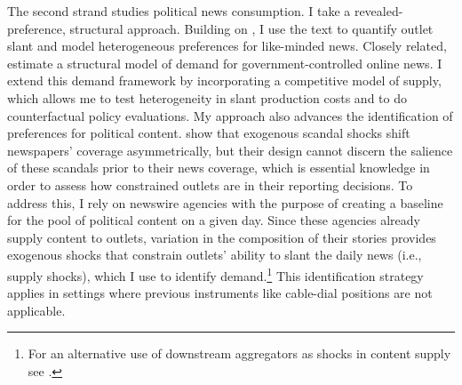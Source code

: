 \documentclass[12pt]{article}
\begin{document}
The second strand studies political news consumption. I take a revealed-preference, structural approach. Building on \citet{gentzkow2010media}, I use the text to quantify outlet slant and model heterogeneous preferences for like-minded news. Closely related, \citet{SimonovRao2022} estimate a structural model of demand for government-controlled online news. I extend this demand framework by incorporating a competitive model of supply, which allows me to test heterogeneity in slant production costs and to do counterfactual policy evaluations. My approach also advances the identification of preferences for political content. \citet{Puglisi2011NewspaperCO} show that exogenous scandal shocks shift  newspapers’ coverage asymmetrically, but their design cannot discern the salience of these scandals prior to their news coverage, which is essential knowledge in order to assess how constrained outlets are in their reporting decisions. To address this, I rely on newswire agencies with the purpose of creating a baseline for the pool of political content on a given day. Since these agencies already supply content to outlets, variation in the composition of their stories provides exogenous shocks that constrain outlets’ ability to slant the daily news (i.e., supply shocks), which I use to identify demand.\footnote{For an alternative use of downstream aggregators as shocks in content supply see \cite{milena}.} This identification strategy applies in settings where previous instruments like cable-dial positions \citep{martin2017} are not applicable.


\end{document}
